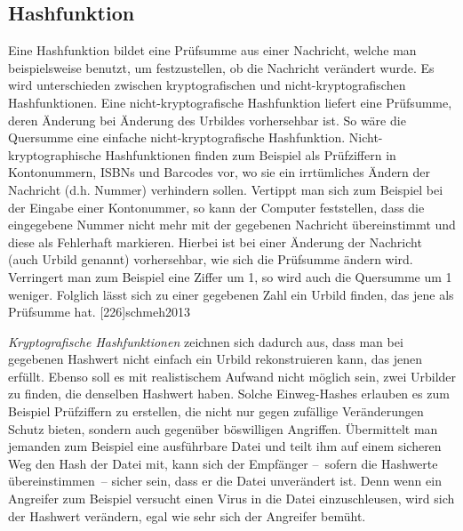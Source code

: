 \subsection{Hashfunktion}

Eine Hashfunktion bildet eine Prüfsumme aus einer Nachricht, welche man beispielsweise benutzt, um festzustellen, ob die Nachricht verändert wurde.
Es wird unterschieden zwischen kryptografischen und nicht-kryptografischen Hashfunktionen.
Eine nicht-kryptografische Hashfunktion liefert eine Prüfsumme, deren Änderung bei Änderung des Urbildes vorhersehbar ist.
So wäre die Quersumme eine einfache nicht-kryptografische Hashfunktion.
Nicht-kryptographische Hashfunktionen finden zum Beispiel als Prüfziffern in Kontonummern, ISBNs und Barcodes vor, wo sie ein irrtümliches Ändern der Nachricht (d.h. Nummer) verhindern sollen.
Vertippt man sich zum Beispiel bei der Eingabe einer Kontonummer, so kann der Computer feststellen, dass die eingegebene Nummer nicht mehr mit der gegebenen Nachricht übereinstimmt und diese als Fehlerhaft markieren.
Hierbei ist bei einer Änderung der Nachricht (auch Urbild genannt) vorhersehbar, wie sich die Prüfsumme ändern wird.
Verringert man zum Beispiel eine Ziffer um 1, so wird auch die Quersumme um 1 weniger.
Folglich lässt sich zu einer gegebenen Zahl ein Urbild finden, das jene als Prüfsumme hat.
[226]{schmeh2013}

\emph{Kryptografische Hashfunktionen} zeichnen sich dadurch aus, dass man bei gegebenen Hashwert nicht einfach ein Urbild rekonstruieren kann, das jenen erfüllt.
Ebenso soll es mit realistischem Aufwand nicht möglich sein, zwei Urbilder zu finden, die denselben Hashwert haben.
Solche Einweg-Hashes erlauben es zum Beispiel Prüfziffern zu erstellen, die nicht nur gegen zufällige Veränderungen Schutz bieten, sondern auch gegenüber böswilligen Angriffen.
Übermittelt man jemanden zum Beispiel eine ausführbare Datei und teilt ihm auf einem sicheren Weg den Hash der Datei mit, kann sich der Empfänger --~sofern die Hashwerte übereinstimmen~-- sicher sein, dass er die Datei unverändert ist.
Denn wenn ein Angreifer zum Beispiel versucht einen Virus in die Datei einzuschleusen, wird sich der Hashwert verändern, egal wie sehr sich der Angreifer bemüht.
